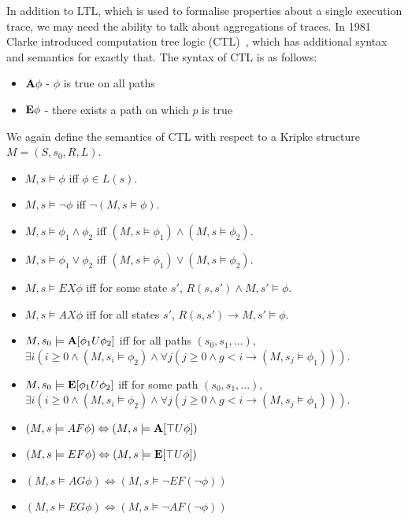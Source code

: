 In addition to LTL, which is used to formalise properties about a single
execution trace, we may need the ability to talk about aggregations of traces.
In 1981 Clarke introduced computation tree logic (CTL)~\cite{Clarke81}, which
has additional syntax and semantics for exactly that. The syntax of CTL is as
follows:

\begin{itemize}
    \item $\textbf{A}\phi$ - $\phi$ is true on all paths
    \item $\textbf{E}\phi$ - there exists a path on which $p$ is true
\end{itemize}

We again define the semantics of CTL with respect to a Kripke structure $M = (S, s_0, R, L)$.

\begin{itemize}
    \item $M, s \models \phi$ iff $\phi \in L(s)$.
    \item $M, s \models \lnot\phi$ iff $\lnot (M, s \models \phi)$.
    \item $M, s \models \phi_1 \land \phi_2$ iff $(M, s \models \phi_1) \land (M, s \models \phi_2)$.
    \item $M, s \models \phi_1 \lor \phi_2$ iff $(M, s \models \phi_1) \lor (M, s \models \phi_2)$.
    \item $M, s \models EX\phi$ iff for some state $s'$, $R(s, s') \land M, s' \models \phi$.
    \item $M, s \models AX\phi$ iff for all states $s'$, $R(s, s') \to M, s' \models \phi$.
    \item $M, s_0 \models \textbf{A}[\phi_1 U \phi_2]$ iff for all paths $(s_0, s_1, ...)$, $\exists i (i \geq 0 \land (M, s_i \models \phi_2) \land \forall j (j \geq 0 \land g < i \to (M, s_j \models \phi_1)))$.
    \item $M, s_0 \models \textbf{E}[\phi_1 U \phi_2]$ iff for some path $(s_0, s_1, ...)$, $\exists i (i \geq 0 \land (M, s_i \models \phi_2) \land \forall j (j \geq 0 \land g < i \to (M, s_j \models \phi_1)))$.
    \item $(M, s \models AF\phi) \Leftrightarrow (M, s \models \textbf{A}[\top U \phi])$
    \item $(M, s \models EF\phi) \Leftrightarrow (M, s \models \textbf{E}[\top U \phi])$
    \item $(M, s \models AG\phi) \Leftrightarrow (M, s \models \lnot EF (\lnot \phi))$
    \item $(M, s \models EG\phi) \Leftrightarrow (M, s \models \lnot AF (\lnot \phi))$
\end{itemize}

